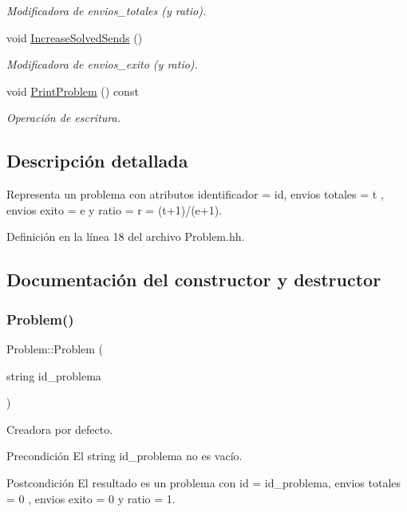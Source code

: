 \begin{DoxyCompactItemize}
\begin{DoxyCompactList}\small\item\em Modificadora de envios\+\_\+totales (y ratio). \end{DoxyCompactList}\item 
void \mbox{\hyperlink{class_problem_ada706600dfd8d1f49096a23f8d22db33}{Increase\+Solved\+Sends}} ()
\begin{DoxyCompactList}\small\item\em Modificadora de envios\+\_\+exito (y ratio). \end{DoxyCompactList}\item 
void \mbox{\hyperlink{class_problem_a17e3ab7cc42f4f8c814fe5e8e08e3e9d}{Print\+Problem}} () const
\begin{DoxyCompactList}\small\item\em Operación de escritura. \end{DoxyCompactList}\end{DoxyCompactItemize}


\subsection{Descripción detallada}
Representa un problema con atributos identificador = id, envios totales = t , envios exito = e y ratio = r = (t+1)/(e+1). 

Definición en la línea 18 del archivo Problem.\+hh.



\subsection{Documentación del constructor y destructor}
\mbox{\label{class_problem_ad6ccd2727ef6fed802387a29c3a085c0}} 
\subsubsection{\texorpdfstring{Problem()}{Problem()}}
{\footnotesize\ttfamily Problem\+::\+Problem (\begin{DoxyParamCaption}\item[{string}]{id\+\_\+problema }\end{DoxyParamCaption})}



Creadora por defecto. 

\begin{DoxyPrecond}{Precondición}
El string id\+\_\+problema no es vacío. 
\end{DoxyPrecond}
\begin{DoxyPostcond}{Postcondición}
El resultado es un problema con id = id\+\_\+problema, envios totales = 0 , envios exito = 0 y ratio = 1. 
\end{DoxyPostcond}


